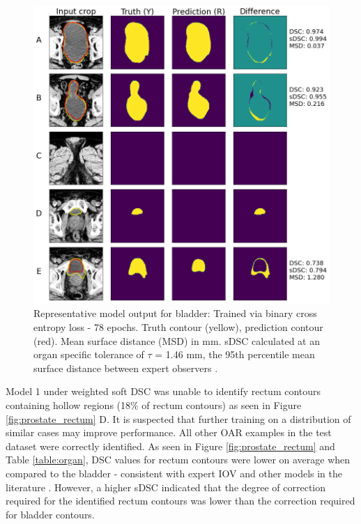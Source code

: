 \begin{figure}[H]
	\begin{center}
		\includegraphics[width=1.0\textwidth]{figures/prostate_BCE_bladder}
		\caption{Representative model output for bladder: Trained via binary cross entropy loss - 78 epochs. Truth contour (yellow), prediction contour (red). Mean surface distance (MSD) in mm. sDSC \cite{Nikolov_2018} calculated at an organ specific tolerance of $\tau$ = 1.46 mm, the 95th percentile mean surface distance between expert observers \cite{Roach_2019}.}
		\label{fig:prostate_BCE_bladder}
	\end{center}
\end{figure}

Model 1 under weighted soft DSC was unable to identify rectum contours containing hollow regions (18\% of rectum contours) as seen in Figure \ref{fig:prostate_rectum} D. It is suspected that further training on a distribution of similar cases may improve performance. All other OAR examples in the test dataset were correctly identified. As seen in Figure \ref{fig:prostate_rectum} and Table \ref{table:organ}, DSC values for rectum contours were lower on average when compared to the bladder - consistent with expert IOV \cite{Roach_2019} and other models in the literature \cite{Liu_2020, Kazemifar_2018, Wong2020}. However, a higher sDSC indicated that the degree of correction required for the identified rectum contours was lower than the correction required for bladder contours.



